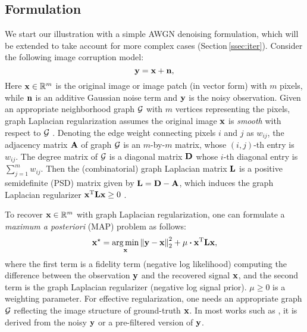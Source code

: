 \documentclass[10pt,twocolumn,letterpaper]{article}
\begin{document}
\subsection{Formulation}
\label{ssec:glr_general}
%
We start our illustration with a simple AWGN denoising formulation, which will be extended to take account for more complex cases (Section\,\ref{ssec:iter}). 
Consider the following image corruption model:
%
\begin{equation}\label{eq:corrupt}
{\bf y} = {\bf x} + {\bf n},
\end{equation}
%
Here ${\bf x}\in\mathbb{R}^m$ is the original image or image patch (in vector form) with $m$ pixels, while ${\bf n}$ is an additive Gaussian noise term and ${\bf y}$ is the noisy observation. 
Given an appropriate neighborhood graph ${\cal G}$ with $m$ vertices representing the pixels, graph Laplacian regularization assumes the original image ${\bf x}$ is \emph{smooth} with respect to ${\cal G}$ \cite{shuman2013emerging}. 
Denoting the edge weight connecting pixels $i$ and $j$ as $w_{ij}$, the adjacency matrix ${\bf A}$ of graph ${\cal G}$ is an $m$-by-$m$ matrix, whose $(i,j)$-th entry is $w_{ij}$. 
The degree matrix of ${\cal G}$ is a diagonal matrix ${\bf D}$ whose $i$-th diagonal entry is $\sum\nolimits_{j=1}^{m}{w}_{ij}$. 
Then the (combinatorial) graph Laplacian matrix ${\bf L}$ is a positive semidefinite (PSD) matrix given by ${\bf L} = {\bf D} - {\bf A}$, which induces the graph Laplacian regularizer ${\bf x}^{\rm T}{\bf L}{\bf x}\ge 0$ \cite{shuman2013emerging}. 

To recover ${\bf x}\in\mathbb{R}^m$ with graph Laplacian regularization, one can formulate a \textit{maximum a posteriori} (MAP) problem as follows:
%
\begin{equation}\label{eq:qp_glr}
{\bf x}^{\star} = \mathop {\arg \min }\limits_{\bf{x}} {{\left\| {  {\bf y} - {\bf x} } \right\|}_2^2} + \mu\bm\cdot{\bf x}^{\rm T}{\bf Lx},
\end{equation}
%
where the first term is a fidelity term (negative log likelihood) computing the difference between the observation ${\bf y}$ and the recovered signal ${\bf x}$, and the second term is the graph Laplacian regularizer (negative log signal prior). 
$\mu\ge 0$ is a weighting parameter. 
For effective regularization, one needs an appropriate graph $\cal G$ reflecting the image structure of ground-truth ${\bf x}$. 
In most works such as \cite{pang2017graph,hu2016graph,osher2017low}, it is derived from the noisy $\bf{y}$ or a pre-filtered version of $\bf{y}$. 
\end{document}
